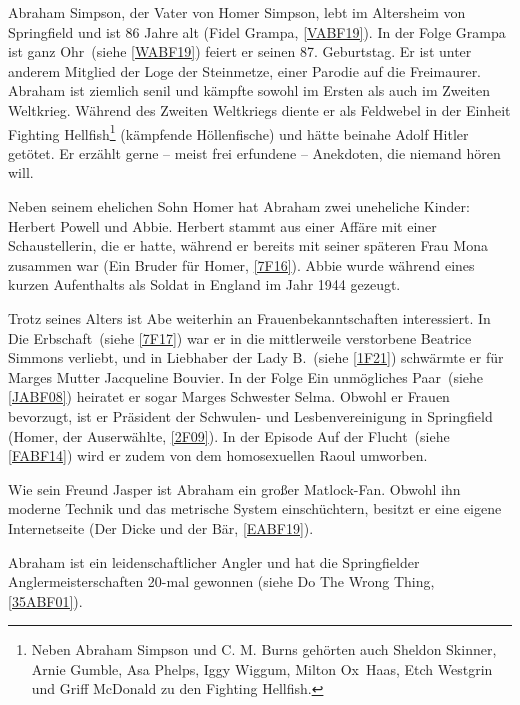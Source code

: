 Abraham Simpson, der Vater von Homer Simpson, lebt im Altersheim von Springfield und ist 86 Jahre alt (\glqq Fidel Grampa\grqq, \ref{VABF19}). In der Folge \glqq Grampa ist ganz Ohr\grqq\ (siehe \ref{WABF19}) feiert er seinen 87. Geburtstag. Er ist unter anderem Mitglied der Loge der Steinmetze, einer Parodie auf die Freimaurer. Abraham ist ziemlich senil und kämpfte sowohl im Ersten als auch im Zweiten Weltkrieg. Während des Zweiten Weltkriegs diente er als Feldwebel in der Einheit Fighting Hellfish\footnote{Neben Abraham Simpson und C. M. Burns gehörten auch Sheldon Skinner, Arnie Gumble, Asa Phelps, Iggy Wiggum, Milton \glqq Ox\grqq\ Haas, Etch Westgrin und Griff McDonald zu den Fighting Hellfish.} (kämpfende Höllenfische) und hätte beinahe Adolf Hitler getötet. Er erzählt gerne -- meist frei erfundene -- Anekdoten, die niemand hören will.

Neben seinem ehelichen Sohn Homer hat Abraham zwei uneheliche Kinder: Herbert Powell und Abbie. Herbert stammt aus einer Affäre mit einer Schaustellerin, die er hatte, während er bereits mit seiner späteren Frau Mona zusammen war (\glqq Ein Bruder für Homer\grqq, \ref{7F16}). Abbie wurde während eines kurzen Aufenthalts als Soldat in England im Jahr 1944 gezeugt.

Trotz seines Alters ist Abe weiterhin an Frauenbekanntschaften interessiert. In \glqq Die Erbschaft\grqq\ (siehe \ref{7F17}) war er in die mittlerweile verstorbene Beatrice Simmons verliebt, und in \glqq Liebhaber der Lady B.\grqq\ (siehe \ref{1F21}) schwärmte er für Marges Mutter Jacqueline Bouvier. In der Folge \glqq Ein unmögliches Paar\grqq\ (siehe \ref{JABF08}) heiratet er sogar Marges Schwester Selma. Obwohl er Frauen bevorzugt, ist er Präsident der Schwulen- und Lesbenvereinigung in Springfield (\glqq Homer, der Auserwählte\grqq, \ref{2F09}). In der Episode \glqq Auf der Flucht\grqq\ (siehe \ref{FABF14}) wird er zudem von dem homosexuellen Raoul umworben.

Wie sein Freund Jasper ist Abraham ein großer Matlock-Fan. Obwohl ihn moderne Technik und das metrische System einschüchtern, besitzt er eine eigene Internetseite (\glqq Der Dicke und der Bär\grqq, \ref{EABF19}).

Abraham ist ein leidenschaftlicher Angler und hat die Springfielder Anglermeisterschaften 20-mal gewonnen (siehe \glqq Do The Wrong Thing\grqq, \ref{35ABF01}).

